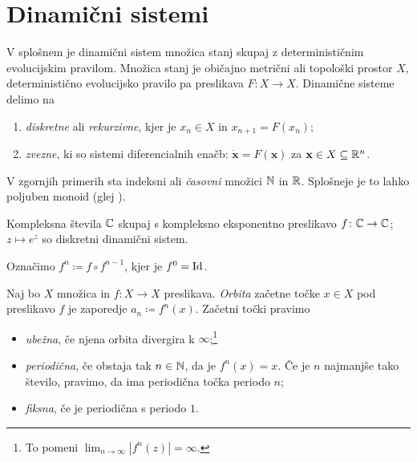 \section{Dinamični sistemi} \label{sec:dis}

V splošnem je dinamični sistem množica stanj skupaj z determinističnim evolucijskim pravilom. Množica stanj je običajno metrični ali topološki prostor \(X\), deterministično evolucijsko pravilo pa preslikava \(F \colon X \to X\). Dinamične sisteme delimo na

\begin{enumerate}
    \item \emph{diskretne} ali \emph{rekurzivne}, kjer je \(x_n \in X\) in
        \(x_{n + 1} = F (x_n)\);
    \item \emph{zvezne}, ki so sistemi diferencialnih enačb:
        \(\dot{\mathbf{x}} = F (\mathbf{x})\) za
        \(\mathbf{x} \in X \subseteq \mathbb R^n\).
\end{enumerate}

\noindent V zgornjih primerih sta indeksni ali \emph{časovni} množici \(\mathbb N\) in \(\mathbb R\). Splošneje je to lahko poljuben monoid (glej \cite{Giunti_2012}).

\begin{zgled}
    Kompleksna števila \(\mathbb C\) skupaj s kompleksno eksponentno preslikavo \(f \colon \mathbb C \to \mathbb C\); \(z \mapsto e^{z}\) so diskretni dinamični sistem.
\end{zgled}

\noindent Označimo \(f^n \coloneq f \circ f^{n - 1}\), kjer je
\(f^0 = \operatorname{Id}\).

\begin{definicija}
    Naj bo \(X\) množica in \(f \colon X \to X\) preslikava. \emph{Orbita} začetne točke \(x \in X\) pod preslikavo \(f\) je zaporedje \(a_n \coloneq f^n (x)\). Začetni točki pravimo
    \begin{itemize}
        \item \emph{ubežna}, če njena orbita divergira k \(\infty\);\footnote{To pomeni \(\lim_{n \to \infty} |f^n (z)| = \infty\).}
        \item \emph{periodična}, če obstaja tak \(n \in \mathbb N\), da je \(f^n (x) = x\). Če je \(n\) najmanjše tako število, pravimo, da ima periodična točka periodo \(n\);
        \item \emph{fiksna}, če je periodična s periodo \(\num{1}\).
    \end{itemize}
\end{definicija}

